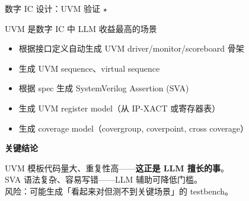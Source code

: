 \documentclass[UTF8,11pt,aspectratio=169]{beamer}
\newenvironment{keypoint}{
  \begin{block}{\textbf{关键结论}}
}{
  \end{block}
}
\begin{document}
\begin{frame}{数字 IC 设计：UVM 验证 $\star$}
  \begin{block}{UVM 是数字 IC 中 LLM 收益最高的场景}
    \begin{itemize}
      \item 根据接口定义自动生成 UVM driver/monitor/scoreboard 骨架
      \item 生成 UVM sequence、virtual sequence
      \item 根据 spec 生成 SystemVerilog Assertion (SVA)
      \item 生成 UVM register model（从 IP-XACT 或寄存器表）
      \item 生成 coverage model（covergroup, coverpoint, cross coverage）
    \end{itemize}
  \end{block}

  \vspace{0.3em}
  \begin{keypoint}
    UVM 模板代码量大、重复性高------\textbf{这正是 LLM 擅长的事}。\\
    SVA 语法复杂、容易写错------LLM 辅助可降低门槛。\\
    风险：可能生成「看起来对但测不到关键场景」的 testbench。
  \end{keypoint}
\end{frame}
\end{document}

